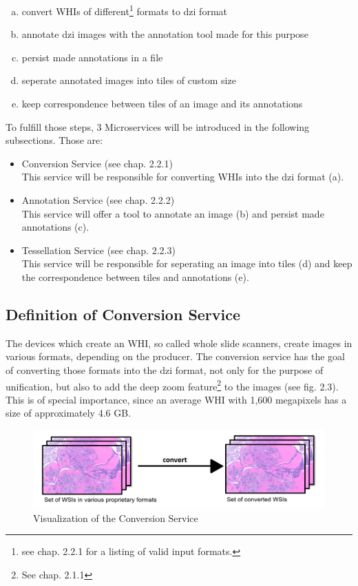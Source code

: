 \begin{enumerate}[(a)]
	\item convert WHIs of different\footnote{see chap. 2.2.1 for a listing of valid input formats.} formats to dzi format
	\item annotate dzi images with the annotation tool made for this purpose
	\item persist made annotations in a file
	\item seperate annotated images into tiles of custom size
	\item keep correspondence between tiles of an image and its annotations
\end{enumerate}

To fulfill those steps, 3 Microservices will be introduced in the following subsections. Those are:

\begin{itemize}
	\item Conversion Service (see chap. 2.2.1)\\
	This service will be responsible for converting WHIs into the dzi format (a).
	\item Annotation Service (see chap. 2.2.2)\\
	This service will offer a tool to annotate an image (b) and persist made annotations (c).
	\item Tessellation Service (see chap. 2.2.3)\\
	This service will be responsible for seperating an image into tiles (d) and keep the correspondence between tiles and annotations (e).
\end{itemize}


\subsection{Definition of Conversion Service}

The devices which create an WHI, so called whole slide scanners, create images in various formats, depending on the producer. The conversion service has the goal of converting those formats into the dzi format, not only for the purpose of unification, but also to add the deep zoom feature\footnote{See chap. 2.1.1} to the images (see fig. 2.3). This is of special importance, since an average WHI with 1,600 megapixels has a size of approximately 4.6 GB\cite{Farahanil15}.

\begin{figure}[H]
	\begin{center}
		\includegraphics[scale=0.35]{img/processChainA.png}
		\caption{Visualization of the Conversion Service}
		\label{fig:fig2.3}
	\end{center}
\end{figure}

